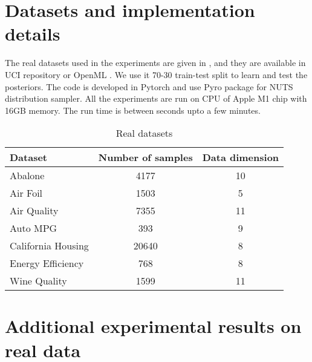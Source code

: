 \section{Datasets and implementation details}
\label{app:exp}

The real datasets used in the experiments are given in , and they are available in UCI repository \citep{uci} or OpenML \citep{OpenML2013}.
We use it 70-30 train-test split to learn and test the posteriors.
%
The code is developed in Pytorch \citep{paszke2017automatic} and use Pyro package \citep{bingham2019pyro} for NUTS distribution sampler. 
All the experiments are run on CPU of Apple M1 chip with 16GB memory. The run time is between seconds upto a few minutes.

\begin{table}[h]
    \centering
    \begin{tabular}{lcc}
\toprule
Dataset            & Number of samples         & Data dimension \\ \midrule
Abalone            & 4177 & 10             \\
Air Foil           & 1503                      & 5              \\ 
Air Quality        & 7355                      & 11             \\ 
Auto MPG           & 393                       & 9              \\ 
California Housing & 20640                     & 8              \\ 
Energy Efficiency  & 768                       & 8              \\ 
Wine Quality       & 1599                      & 11             \\ \bottomrule
\end{tabular}
    \caption{Real datasets}
    \vspace{-0.4cm}
    \label{tab:data_stat}
\end{table}

\clearpage

\section{Additional experimental results on real data}
\label{app:exp_real}

